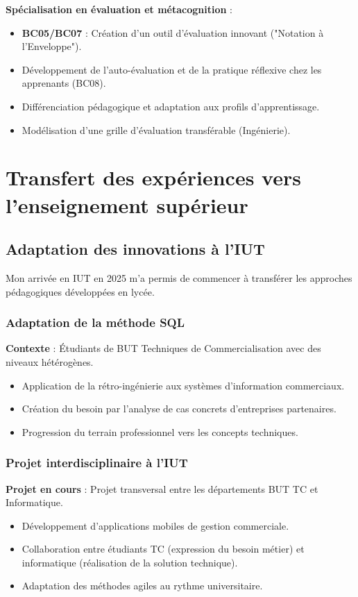 \textbf{Spécialisation en évaluation et métacognition} :
\begin{itemize}[leftmargin=*]
    \item \textbf{BC05/BC07} : Création d'un outil d'évaluation innovant ("Notation à l'Enveloppe").
    \item Développement de l'auto-évaluation et de la pratique réflexive chez les apprenants (BC08).
    \item Différenciation pédagogique et adaptation aux profils d'apprentissage.
    \item Modélisation d'une grille d'évaluation transférable (Ingénierie).
\end{itemize}

\section{Transfert des expériences vers l'enseignement supérieur}

\subsection{Adaptation des innovations à l'IUT}

Mon arrivée en IUT en 2025 m'a permis de commencer à transférer les approches pédagogiques développées en lycée.

\subsubsection{Adaptation de la méthode SQL}

\textbf{Contexte} : Étudiants de BUT Techniques de Commercialisation avec des niveaux hétérogènes.
\begin{itemize}[leftmargin=*]
    \item Application de la rétro-ingénierie aux systèmes d'information commerciaux.
    \item Création du besoin par l'analyse de cas concrets d'entreprises partenaires.
    \item Progression du terrain professionnel vers les concepts techniques.
\end{itemize}

\subsubsection{Projet interdisciplinaire à l'IUT}

\textbf{Projet en cours} : Projet transversal entre les départements BUT TC et Informatique.
\begin{itemize}[leftmargin=*]
    \item Développement d'applications mobiles de gestion commerciale.
    \item Collaboration entre étudiants TC (expression du besoin métier) et informatique (réalisation de la solution technique).
    \item Adaptation des méthodes agiles au rythme universitaire.
\end{itemize}

